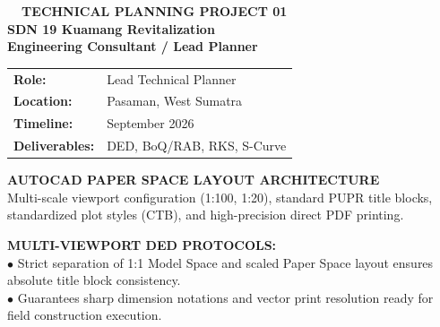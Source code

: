 \documentclass[10pt,a4paper,landscape]{article}
\begin{document}
\noindent
\begin{minipage}[t]{0.30\linewidth}
  \vspace{0pt}
  \begin{tcolorbox}[sharp corners, boxrule=0.8pt, colframe=pborder, colback=white, left=3mm, right=3mm, top=2.5mm, bottom=2.5mm, height=100mm]
    \colorbox{pred}{\fontsize{7pt}{8pt}\selectfont\bfseries\color{white}\ \ TECHNICAL PLANNING PROJECT 01\ \ }\\[1.5mm]
    {\fontsize{9.5pt}{11.5pt}\selectfont\bfseries\color{pnavy}SDN 19 Kuamang Revitalization}\\[0.5mm]
    {\fontsize{7pt}{8.5pt}\selectfont\bfseries\color{pred}Engineering Consultant / Lead Planner}\\[2mm]

    \begin{tcolorbox}[sharp corners, boxrule=0.5pt, colframe=pborder, colback=pbglight, left=2mm, right=2mm, top=1.5mm, bottom=1.5mm]
      \begin{tabularx}{\linewidth}{@{}p{22mm} X@{}}
        {\fontsize{6.8pt}{8pt}\selectfont\bfseries Role:} & {\fontsize{6.8pt}{8pt}\selectfont Lead Technical Planner} \\[0.8mm]
        {\fontsize{6.8pt}{8pt}\selectfont\bfseries Location:} & {\fontsize{6.8pt}{8pt}\selectfont Pasaman, West Sumatra} \\[0.8mm]
        {\fontsize{6.8pt}{8pt}\selectfont\bfseries Timeline:} & {\fontsize{6.8pt}{8pt}\selectfont September 2026} \\[0.8mm]
        {\fontsize{6.8pt}{8pt}\selectfont\bfseries Deliverables:} & {\fontsize{6.8pt}{8pt}\selectfont DED, BoQ/RAB, RKS, S-Curve}
      \end{tabularx}
    \end{tcolorbox}
    \vspace{1.5mm}

    {\fontsize{7.5pt}{9pt}\selectfont\bfseries\color{pnavy}AUTOCAD PAPER SPACE LAYOUT ARCHITECTURE}\\[0.8mm]
    {\fontsize{6.5pt}{8.2pt}\selectfont\color{psteel}
    Multi-scale viewport configuration (1:100, 1:20), standard PUPR title blocks, standardized plot styles (CTB), and high-precision direct PDF printing.
    }
  \end{tcolorbox}
  \vspace{2mm}

  \begin{tcolorbox}[sharp corners, boxrule=0.6pt, colframe=pnavy, colback=pbglight, left=2.5mm, right=2.5mm, top=2mm, bottom=2mm, height=52mm]
    {\fontsize{7pt}{8.5pt}\selectfont\bfseries\color{pnavy}MULTI-VIEWPORT DED PROTOCOLS:}\\[1.5mm]
    {\fontsize{6.5pt}{8.2pt}\selectfont\color{psteel}
    $\bullet$ Strict separation of 1:1 Model Space and scaled Paper Space layout ensures absolute title block consistency.\\
    $\bullet$ Guarantees sharp dimension notations and vector print resolution ready for field construction execution.
    }
  \end{tcolorbox}
\end{minipage}%
\end{document}
